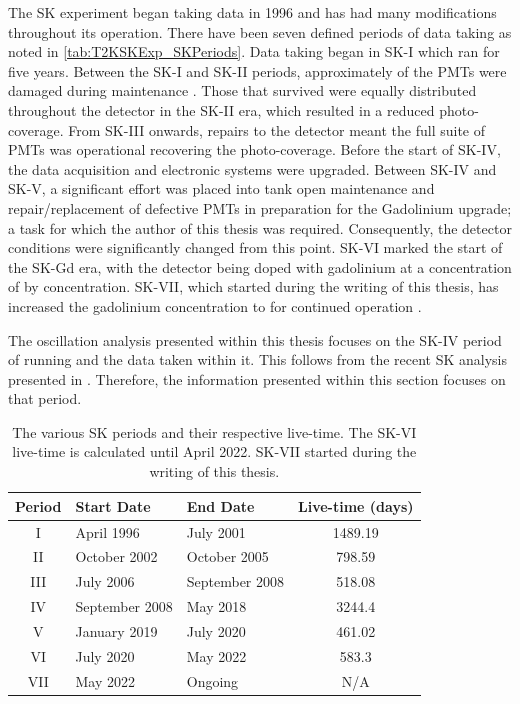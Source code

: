 The SK experiment began taking data in 1996 \cite{Fukuda1998-tw} and has had many modifications throughout its operation. There have been seven defined periods of data taking as noted in \autoref{tab:T2KSKExp_SKPeriods}. Data taking began in SK-I which ran for five years. Between the SK-I and SK-II periods, approximately  of the PMTs were damaged during maintenance \cite{Abe_2014_SKCalib}. Those that survived were equally distributed throughout the detector in the SK-II era, which resulted in a reduced  photo-coverage. From SK-III onwards, repairs to the detector meant the full suite of PMTs was operational recovering the  photo-coverage. Before the start of SK-IV, the data acquisition and electronic systems were upgraded. Between SK-IV and SK-V, a significant effort was placed into tank open maintenance and repair/replacement of defective PMTs in preparation for the Gadolinium upgrade; a task for which the author of this thesis was required. Consequently, the detector conditions were significantly changed from this point. SK-VI marked the start of the SK-Gd era, with the detector being doped with gadolinium at a concentration of  by concentration. SK-VII, which started during the writing of this thesis, has increased the gadolinium concentration to  for continued operation \cite{10.5281/zenodo.6694761}.

The oscillation analysis presented within this thesis focuses on the SK-IV period of running and the data taken within it. This follows from the recent SK analysis presented in \cite{thesis_miao}. Therefore, the information presented within this section focuses on that period.

\begin{table}[ht!]
    \centering
    \begin{tabular}{c|l|l|c}
      \hline
      Period & Start Date & End Date & Live-time (days) \\
      \hline
      I & April 1996 & July 2001 & 1489.19 \\
      II & October 2002 & October 2005 & 798.59 \\
      III & July 2006 & September 2008 & 518.08 \\
      IV & September 2008 & May 2018 & 3244.4 \\
      V & January 2019 & July 2020 & 461.02 \\
      VI & July 2020 & May 2022 & 583.3 \\
      VII & May 2022 & Ongoing & N/A \\
      \hline 
      \hline
    \end{tabular}
    \caption{The various SK periods and their respective live-time. The SK-VI live-time is calculated until  April 2022. SK-VII started during the writing of this thesis.}
    \label{tab:T2KSKExp_SKPeriods}
\end{table}

